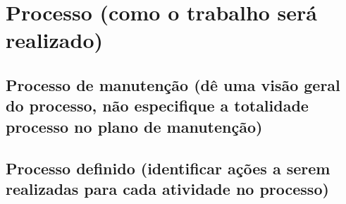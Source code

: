 \chapter{Processo (como o trabalho será realizado)}

\section{Processo de manutenção (dê uma visão geral do processo, não especifique a totalidade processo no plano de manutenção)}

\section{Processo definido (identificar ações a serem realizadas para cada atividade no processo)}